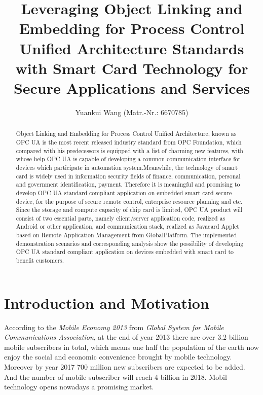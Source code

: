 \documentclass[]{llncs}
\begin{document}
\title{Leveraging Object Linking and Embedding for Process Control Unified Architecture
Standards with Smart Card Technology for Secure Applications and Services} %
\author{Yuankui Wang (Matr.-Nr.: 6670785)}

\maketitle

\begin{abstract}

Object Linking and Embedding for Process Control Unified Architecture, known as OPC UA is the most recent released industry standard from OPC Foundation, which compared with his predecessors is equipped with a list of charming new features, with whose help OPC UA is capable of developing a common communication interface for devices which participate in automation system.Meanwhile, the technology of smart card is widely used in information security fields of finance, communication, personal and government identification, payment. Therefore it is meaningful and promising to develop OPC UA standard compliant application on embedded smart card secure device, for the purpose of secure remote control, enterprise resource planning and etc. Since the storage and compute capacity of chip card is limited, OPC UA product will consist of two essential parts, namely client/server application code, realized as Android or other application, and communication stack, realized as Javacard Applet based on Remote Application Management from GlobalPlatform. The implemented demonstration scenarios and corresponding analysis show the possibility of developing OPC UA standard compliant application on devices embedded with smart card to benefit customers. 
\end{abstract}

\section{Introduction and Motivation}

According to the \emph{Mobile Economy 2013} from \emph{Global System for Mobile Communications Association}, at the end of year 2013 there are over 3.2 billion mobile   subscribers in total, which means one half the population of the earth now enjoy the social and economic convenience brought by mobile technology. Moreover by year 2017 700 million new subscribers are expected to be added. And the number of mobile subscriber will reach 4 billion in 2018. Mobil technology opens nowadays a promising market. 
\end{document}
